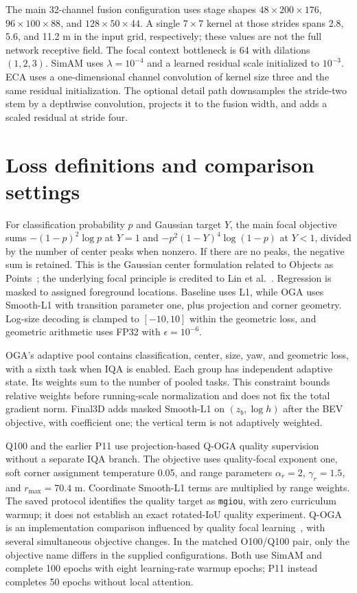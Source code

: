 \documentclass[10pt]{article}
\begin{document}
The main 32-channel fusion configuration uses stage shapes $48\times200\times176$, $96\times100\times88$, and $128\times50\times44$. A single $7\times7$ kernel at those strides spans 2.8, 5.6, and 11.2 m in the input grid, respectively; these values are not the full network receptive field. The focal context bottleneck is 64 with dilations $(1,2,3)$. SimAM uses $\lambda=10^{-4}$ and a learned residual scale initialized to $10^{-3}$. ECA uses a one-dimensional channel convolution of kernel size three and the same residual initialization. The optional detail path downsamples the stride-two stem by a depthwise convolution, projects it to the fusion width, and adds a scaled residual at stride four.

\section{Loss definitions and comparison settings}
\label{sec:loss}
For classification probability $p$ and Gaussian target $Y$, the main focal objective sums $-(1-p)^2\log p$ at $Y=1$ and $-p^2(1-Y)^4\log(1-p)$ at $Y<1$, divided by the number of center peaks when nonzero. If there are no peaks, the negative sum is retained. This is the Gaussian center formulation related to Objects as Points~\cite{zhou2019objects}; the underlying focal principle is credited to Lin et al.~\cite{lin2017focal}. Regression is masked to assigned foreground locations. Baseline uses L1, while OGA uses Smooth-L1 with transition parameter one, plus projection and corner geometry. Log-size decoding is clamped to $[-10,10]$ within the geometric loss, and geometric arithmetic uses FP32 with $\epsilon=10^{-6}$.

OGA's adaptive pool contains classification, center, size, yaw, and geometric loss, with a sixth task when IQA is enabled. Each group has independent adaptive state. Its weights sum to the number of pooled tasks. This constraint bounds relative weights before running-scale normalization and does not fix the total gradient norm. Final3D adds masked Smooth-L1 on $(z_b,\log h)$ after the BEV objective, with coefficient one; the vertical term is not adaptively weighted.

Q100 and the earlier P11 use projection-based Q-OGA quality supervision without a separate IQA branch. The objective uses quality-focal exponent one, soft corner assignment temperature 0.05, and range parameters $\alpha_r=2$, $\gamma_r=1.5$, and $r_{\max}=70.4$ m. Coordinate Smooth-L1 terms are multiplied by range weights. The saved protocol identifies the quality target as \texttt{mgiou}, with zero curriculum warmup; it does not establish an exact rotated-IoU quality experiment. Q-OGA is an implementation comparison influenced by quality focal learning~\cite{li2020gfl}, with several simultaneous objective changes. In the matched O100/Q100 pair, only the objective name differs in the supplied configurations. Both use SimAM and complete 100 epochs with eight learning-rate warmup epochs; P11 instead completes 50 epochs without local attention.
\end{document}
